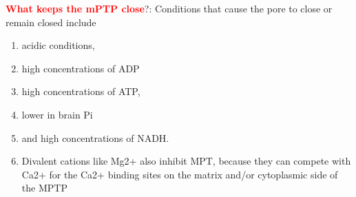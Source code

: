 \textcolor{red}{\bf What keeps the mPTP close}?:
Conditions that cause the pore to close or remain closed include
\begin{enumerate}
  \item  acidic conditions,

  \item high concentrations of ADP

  \item high  concentrations of ATP,

  \item lower in brain Pi

  \item and high concentrations of NADH.

  \item Divalent cations like Mg2+ also inhibit MPT, because they can compete
  with Ca2+ for the Ca2+ binding sites on the matrix and/or cytoplasmic side of
  the MPTP
\end{enumerate}

